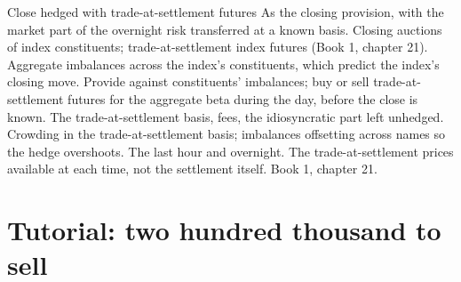 \begin{strategyfile}{Close hedged with trade-at-settlement futures}\label{strat:hf:auctions-and-the-close:tas}
 As the closing provision, with the market part of the overnight risk transferred at a known basis.
 Closing auctions of index constituents; trade-at-settlement index futures (Book 1, chapter 21).
 Aggregate imbalances across the index's constituents, which predict the index's closing move.
 Provide against constituents' imbalances; buy or sell trade-at-settlement futures for the aggregate beta during the
day, before the close is known.
 The trade-at-settlement basis, fees, the idiosyncratic part left unhedged.
 Crowding in the trade-at-settlement basis; imbalances offsetting across names so the hedge overshoots.
 The last hour and overnight.
 The trade-at-settlement prices available at each time, not the settlement itself.
 Book 1, chapter 21.
\end{strategyfile}

\section{Tutorial: two hundred thousand to sell}\label{tut:hf:auctions-and-the-close:tut}

